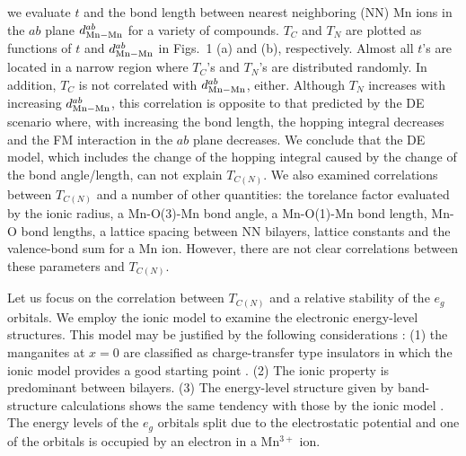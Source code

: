 we evaluate $t$ and the bond length between nearest neighboring (NN) Mn ions in the $ab$ plane 
$d_{\rm Mn-Mn}^{ab}$ for a variety of compounds. 
%
$T_C$ and $T_ N$ are plotted as functions of $t$ and 
$d_{\rm Mn-Mn}^{ab}$   
in Figs.~1 (a) and (b), respectively. 
Almost all $t$'s are located in a narrow region 
where $T_C$'s and $T_N$'s are distributed randomly.
%
In addition, $T_C$ is not correlated with $d_{\rm Mn-Mn}^{ab}$, either. 
Although $T_N$ increases with increasing $d_{\rm Mn-Mn}^{ab}$, 
this correlation is opposite to that predicted by the DE scenario where, 
with increasing the bond length, 
the hopping integral decreases and 
the FM interaction in the $ab$ plane decreases. 
%
%
We conclude that the DE model, which includes the change of the hopping integral 
caused by the change of 
the bond angle/length, can not explain $T_{C(N)}$.  
% 
We also examined correlations between $T_{C(N)}$ and 
a number of other quantities: 
the torelance factor evaluated by the ionic radius, 
a Mn-O(3)-Mn bond angle, 
a Mn-O(1)-Mn bond length, Mn-O bond lengths, 
a lattice spacing between NN bilayers, 
lattice constants and the valence-bond sum for a Mn ion. 
However, there are not clear correlations between these parameters 
and $T_{C(N)}$.  
%
\par
%
Let us focus on the correlation between $T_{C(N)}$ and 
a relative stability of the $e_g$ orbitals. 
We employ the ionic model to examine the electronic energy-level structures. 
This model may be justified by 
the following considerations \cite{ohta}: 
(1) the manganites at $x=0$ are classified as charge-transfer type insulators
in which the ionic model provides a good starting point \cite{arima}. 
(2) The ionic property is predominant between bilayers.  
(3) The energy-level structure given by band-structure calculations
shows the same tendency with those by the ionic model \cite{dessau,band}. 
The energy levels of the $e_g$ orbitals split due to the electrostatic potential 
and one of the orbitals is occupied by an electron in a Mn$^{3+}$ ion. 
%

